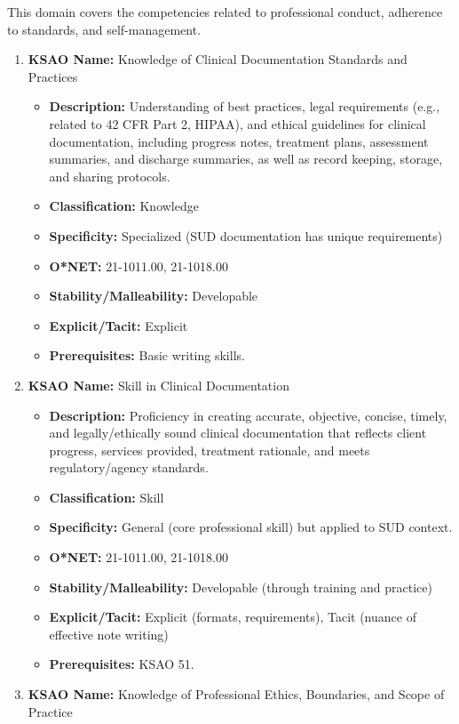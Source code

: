 \documentclass[
  letterpaper,
  DIV=11,
  numbers=noendperiod]{scrartcl}
\providecommand{\tightlist}{%
  \setlength{\itemsep}{0pt}\setlength{\parskip}{0pt}}
\begin{document}
This domain covers the competencies related to professional conduct,
adherence to standards, and self-management.

\begin{enumerate}
\def\labelenumi{\arabic{enumi}.}
\setcounter{enumi}{50}
\tightlist
\item
  \textbf{KSAO Name:} Knowledge of Clinical Documentation Standards and
  Practices

  \begin{itemize}
  \tightlist
  \item
    \textbf{Description:} Understanding of best practices, legal
    requirements (e.g., related to 42 CFR Part 2, HIPAA), and ethical
    guidelines for clinical documentation, including progress notes,
    treatment plans, assessment summaries, and discharge summaries, as
    well as record keeping, storage, and sharing protocols.
  \item
    \textbf{Classification:} Knowledge
  \item
    \textbf{Specificity:} Specialized (SUD documentation has unique
    requirements)
  \item
    \textbf{O*NET:} 21-1011.00, 21-1018.00
  \item
    \textbf{Stability/Malleability:} Developable
  \item
    \textbf{Explicit/Tacit:} Explicit
  \item
    \textbf{Prerequisites:} Basic writing skills.
  \end{itemize}
\item
  \textbf{KSAO Name:} Skill in Clinical Documentation

  \begin{itemize}
  \tightlist
  \item
    \textbf{Description:} Proficiency in creating accurate, objective,
    concise, timely, and legally/ethically sound clinical documentation
    that reflects client progress, services provided, treatment
    rationale, and meets regulatory/agency standards.
  \item
    \textbf{Classification:} Skill
  \item
    \textbf{Specificity:} General (core professional skill) but applied
    to SUD context.
  \item
    \textbf{O*NET:} 21-1011.00, 21-1018.00
  \item
    \textbf{Stability/Malleability:} Developable (through training and
    practice)
  \item
    \textbf{Explicit/Tacit:} Explicit (formats, requirements), Tacit
    (nuance of effective note writing)
  \item
    \textbf{Prerequisites:} KSAO 51.
  \end{itemize}
\item
  \textbf{KSAO Name:} Knowledge of Professional Ethics, Boundaries, and
  Scope of Practice


\end{enumerate}
\end{document}
